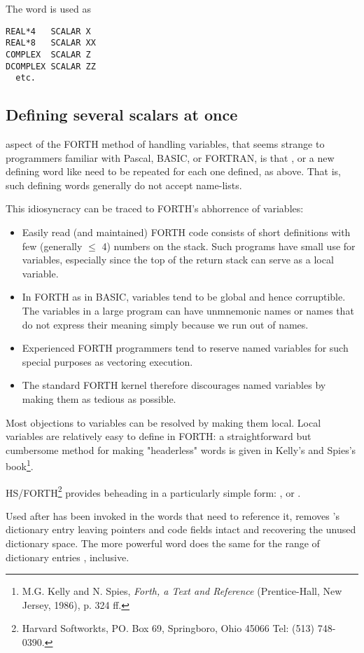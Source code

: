 The word  is used as
\begin{lstlisting}
REAL*4   SCALAR X
REAL*8   SCALAR XX
COMPLEX  SCALAR Z
DCOMPLEX SCALAR ZZ
  etc.
\end{lstlisting}

\subsection{Defining several scalars at once}
 aspect of the FORTH method of handling variables, that seems strange to programmers familiar with Pascal, BASIC, or FORTRAN, is that ,  or a new defining word like  need to be repeated for each one defined, as above. That is, such defining words generally do not accept name-lists.

This idiosyncracy can be traced to FORTH’s abhorrence of variables:
\begin{itemize}
    \item Easily read (and maintained) FORTH code consists of short definitions with few (generally $\leq$ 4) numbers on the stack. Such programs have small use for variables, especially since the top of the return stack can serve as a local variable.
    \item In FORTH as in BASIC, variables tend to be global and hence corruptible. The variables in a large program can have unmnemonic names or names that do not express their meaning simply because we run out of names.
    \item Experienced FORTH programmers tend to reserve named variables for such special purposes as vectoring execution.
    \item The standard FORTH kernel therefore discourages named variables by making them as tedious as possible.
\end{itemize}

Most objections to variables can be resolved by making them local. Local variables are relatively easy to define in FORTH: a straightforward but cumbersome method for making "headerless" words is given in Kelly’s and Spies’s book\footnote{M.G. Kelly and N. Spies, \textit{Forth, a Text and Reference} (Prentice-Hall, New Jersey, 1986), p. 324 ff.}.

HS/FORTH\footnote{Harvard Softworkts, PO. Box 69, Springboro, Ohio 45066 Tel: (513) 748-0390.} provides beheading in a particularly simple form: , or .

Used after  has been invoked in the words that need to reference it,  removes ’s dictionary entry leaving pointers and code fields intact and recovering the unused dictionary space. The more powerful word  does the same for the range of dictionary entries , inclusive.

